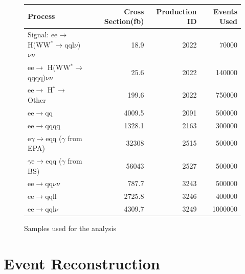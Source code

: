 \renewcommand{\thefootnote}{\roman{footnote}}

\begin{figure}
  \centering
  \begin{tabular}{l r r r}
   \toprule
    Process     & Cross Section(fb)  &   Production ID\cite{bib-prodids}    & Events Used    \\
    \midrule
    Signal: ee$\rightarrow$ H(WW$^*\rightarrow$qql$\nu$)$\nu\nu$                & 18.9    &  2022\footnotemark[1]  & 70000  \\ 
    \midrule
    ee$\rightarrow$ H(WW$^*\rightarrow$qqqq)$\nu\nu$                & 25.6    &  2022\footnotemark[1]    & 140000 \\
    \midrule
    ee$\rightarrow$ H$^*\rightarrow$ Other & 199.6 & 2022\footnotemark[1] & 750000 \\
    \midrule
    ee$\rightarrow$qq               & 4009.5    &  2091  & 500000  \\ 
    \midrule
    ee$\rightarrow$qqqq               & 1328.1    &  2163  & 300000  \\ 
    \midrule
    e$\gamma$$\rightarrow$eqq ($\gamma$ from EPA)                 & 32308    &  2515\footnotemark[2] & 500000   \\ 
    \midrule
    $\gamma$e$\rightarrow$eqq ($\gamma$ from BS)               & 56043  &  2527\footnotemark[2]  & 500000 \\ 
    \midrule
    ee$\rightarrow$qq$\nu\nu$               & 787.7    &  3243 & 500000   \\ 
    \midrule
    ee$\rightarrow$qqll               & 2725.8    &  3246  & 400000  \\ 
    \midrule
    ee$\rightarrow$qql$\nu$              & 4309.7    &  3249 & 1000000   \\ 
    \bottomrule
  \end{tabular}
  \caption[Samples Used]{Samples used for the analysis}
  \label{fig:backgrounds}
\end{figure}


\section{Event Reconstruction}

